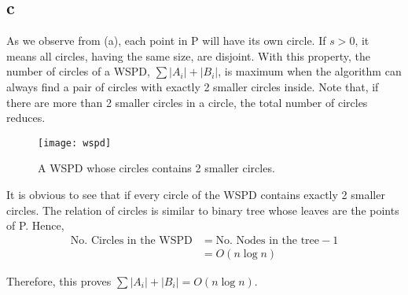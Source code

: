 \subsection*{c}
As we observe from (a), each point in P will have its own circle.
If $s > 0$, it means all circles, having the same size, are disjoint. With this property,
the number of circles of a WSPD, $\sum{|A_i|+|B_i|}$, is maximum when the algorithm
can always find a pair of circles with exactly 2 smaller circles inside.
Note that, if there are more than 2 smaller circles in a circle, the total number of circles reduces. \\

\begin{center}
    \label{figure1}
    \begin{figure}[h]
    \centering
    \texttt{[image: wspd]}\\
    \caption{A WSPD whose circles contains 2 smaller circles.} \label{fig:wspd}
    \end{figure}
\end{center}

It is obvious to see that if every circle of the WSPD  contains exactly 2 smaller circles.
The relation of circles is similar to binary tree whose leaves are the points of P. Hence, \\

\begin{align*}
    \text{No. Circles in the WSPD} &= \text{No. Nodes in the tree} - 1 \\
    &= O(n\log{n})
\end{align*}

Therefore, this proves $\sum{|A_i|+|B_i|} = O(n\log{n})$.
